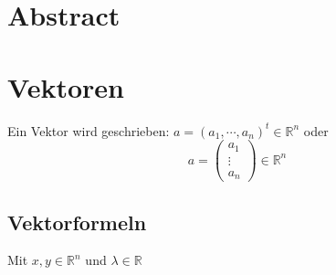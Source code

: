 \documentclass[pdftex,12pt,a4paper,fleqn]{scrartcl}
\title{\doctitle}
\subtitle{\docsubtitle}
\author{\docauthor}
\date{\docdate}
\begin{document}
\tableofcontents 

\section{Abstract}
\begin{abstract} 
Dies ist ein CheatSheet for Mathematik für Informatiker im Sommersemester 2016 an der Universität des Saarlands. 

Mitarbeit jeglicher Art ist gerne gesehen. Du hast einen Fehler entdeckt oder ein Thema fehlt? Dann klick hier \url{https://github.com/UdS-Skripte/MFI-II-CheatSheet} und eröffne eine neue \href{https://github.com/UdS-Skripte/MFI-II-CheatSheet/issues/new}{Issue} oder füge dein Thema selber ein mit einem \href{https://github.com/UdS-Skripte/MFI-II-CheatSheet/compare#fork-destination-box}{Pull\ Request}.

\textbf{Bitte hilf mit, dieses Dokument besser zu machen!}

\subsection{Contributors}

\begin{itemize}
	\item Marvin Hofmann
\end{itemize}
 
\end{abstract}

\newpage

\section{Vektoren}

Ein Vektor wird geschrieben: $a = (a_1, \cdots, a_n)^t \in \mathbb{R}^n$ oder
$$a = \begin{pmatrix}a_{1}\\\vdots\\a_{n}\end{pmatrix} \in \mathbb{R}^n$$

\subsection{Vektorformeln}
Mit $x,y \in \mathbb{R}^n$ und $\lambda \in \mathbb{R}$
\end{document}
